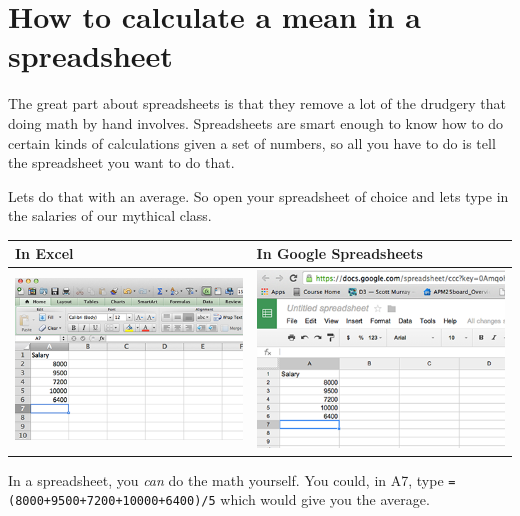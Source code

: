 \documentclass[
]{book}
\begin{document}
\hypertarget{how-to-calculate-a-mean-in-a-spreadsheet}{%
\section{How to calculate a mean in a spreadsheet}\label{how-to-calculate-a-mean-in-a-spreadsheet}}

The great part about spreadsheets is that they remove a lot of the drudgery that doing math by hand involves. Spreadsheets are smart enough to know how to do certain kinds of calculations given a set of numbers, so all you have to do is tell the spreadsheet you want to do that.

Lets do that with an average. So open your spreadsheet of choice and lets type in the salaries of our mythical class.

\begin{longtable}[]{@{}ll@{}}
\toprule
In Excel & In Google Spreadsheets \\
\midrule
\endhead
\includegraphics{images/excelmean1.png} & \includegraphics{images/googlemean1.png} \\
\bottomrule
\end{longtable}

In a spreadsheet, you \emph{can} do the math yourself. You could, in A7, type \texttt{=(8000+9500+7200+10000+6400)/5} which would give you the average.
\end{document}
